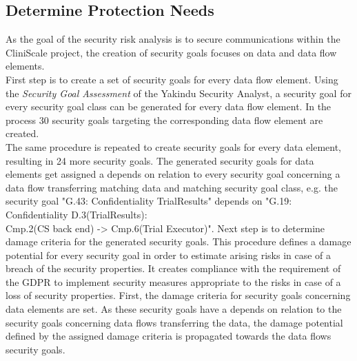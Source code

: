 \subsection{Determine Protection Needs}
As the goal of the security risk analysis is to secure communications within the CliniScale project, the creation of security goals focuses on data and data flow elements.\\
First step is to create a set of security goals for every data flow element. Using the \textit{Security Goal Assessment} of the Yakindu Security Analyst, a security goal for every security goal class can be generated for every data flow element. In the process 30 security goals targeting the corresponding data flow element are created.\\
The same procedure is repeated to create security goals for every data element, resulting in 24 more security goals. The generated security goals for data elements get assigned a depends on relation to every security goal concerning a data flow transferring matching data and matching security goal class, e.g. the security goal "G.43: Confidentiality TrialResults" depends on "G.19: Confidentiality D.3(TrialResults): \\Cmp.2(CS back end) -> Cmp.6(Trial Executor)".
\newline
Next step is to determine damage criteria for the generated security goals. This procedure defines a damage potential for every security goal in order to estimate arising risks in case of a breach of the security properties. It creates compliance with the requirement of the GDPR to implement security measures appropriate to the risks in case of a loss of security properties. First, the damage criteria for security goals concerning data elements are set. As these security goals have a depends on relation to the security goals concerning data flows transferring the data, the damage potential defined by the assigned damage criteria is propagated towards the data flows security goals.\\
\newline
